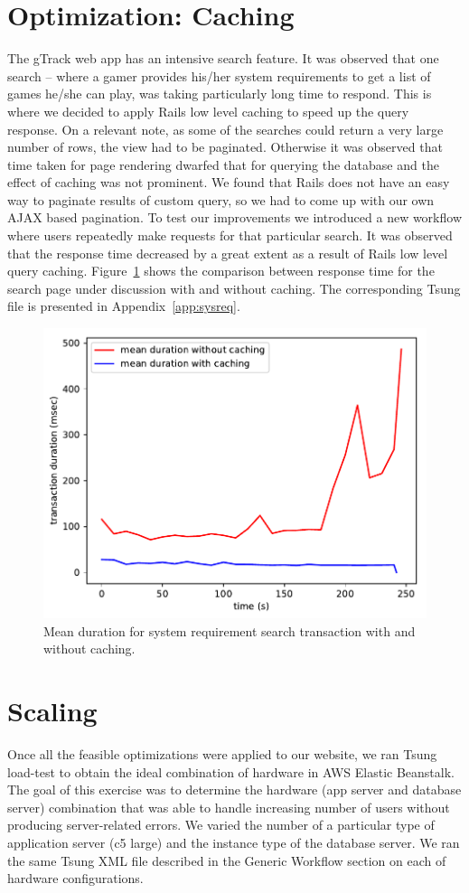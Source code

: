 \section{Optimization: Caching}
The gTrack web app has an intensive search feature. It was observed that one search -- where a gamer provides his/her system requirements to get a list of games he/she can play, was taking particularly long time to respond. This is where we decided to apply Rails low level caching to speed up the query response. On a relevant note, as some of the searches could return a very large number of rows, the view had to be paginated. Otherwise it was observed that time taken for page rendering dwarfed that for querying the database and the effect of caching was not prominent. We found that Rails does not have an easy way to paginate results of custom query, so we had to come up with our own AJAX based pagination. To test our improvements we introduced a new workflow where users repeatedly make requests for that particular search. It was observed that the response time decreased by a great extent as a result of Rails low level query caching. Figure~\ref{fig:caching} shows the comparison between response time for the search page under discussion with and without caching. The corresponding Tsung file is presented in Appendix~\ref{app:sysreq}.
\begin{figure}
	\centering
	\includegraphics{images/caching}
	\caption{Mean duration for system requirement search transaction with and without caching.}\label{fig:caching}
\end{figure}

\section{Scaling}
Once all the feasible optimizations were applied to our website, we ran Tsung load-test to obtain the ideal combination of hardware in AWS Elastic Beanstalk. The goal of this exercise was to determine the hardware (app server and database server) combination that was able to handle increasing number of users without producing server-related errors. We varied the number of a particular type of application server (c5 large) and the instance type of the database server. We ran the same Tsung XML file described in the Generic Workflow section on each of hardware configurations. 

